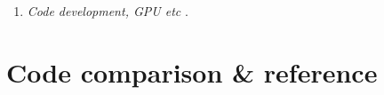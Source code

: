 \documentclass[12pt]{article}
\begin{document}
\begin{enumerate}
\begin{enumerate}
\item
{\em Code development, GPU etc} \citep{
2023RNAAS...7...69L,%
2021JOSS....6.2807P,%
2021arXiv210301597P,%
2017CoPhC.217...11P%
}.

\end{enumerate}
\end{enumerate}

\section{Code comparison \& reference}
\end{document}
